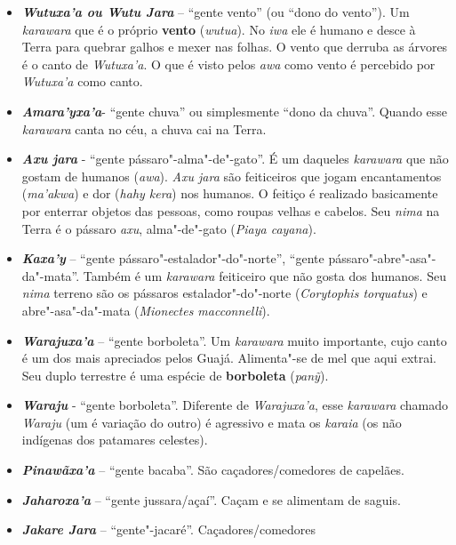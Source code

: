 \begin{itemize}
  \emph{\textbf{Itaxa'a}} -- ``gente pedra'' (também pode ser chamado de
  ``dono da pedra''). Caçadores de anta. Não à toa, a primeira anta,
  criada por \emph{Maira}, foi feita a partir de uma pedra.
\item
  \emph{\textbf{Wutuxa'a ou Wutu Jara}} -- ``gente vento'' (ou ``dono do
  vento''). Um \emph{karawara} que é o próprio \textbf{vento}
  (\emph{wutua}). No \emph{iwa} ele é humano e desce à Terra para
  quebrar galhos e mexer nas folhas. O vento que derruba as árvores é o
  canto de \emph{Wutuxa'a}. O que é visto pelos \emph{awa} como vento é
  percebido por \emph{Wutuxa'a} como canto.
\item
  \emph{\textbf{Amara'yxa'a}}- ``gente chuva'' ou simplesmente ``dono da
  chuva''. Quando esse \emph{karawara} canta no céu, a chuva cai na
  Terra.
\item
  \emph{\textbf{Axu jara}} - ``gente pássaro"-alma"-de"-gato''. É um
  daqueles \emph{karawara} que não gostam de humanos (\emph{awa}).
  \emph{Axu jara} são feiticeiros que jogam encantamentos
  (\emph{ma'akwa}) e dor (\emph{hahy kera}) nos humanos. O feitiço é
  realizado basicamente por enterrar objetos das pessoas, como roupas
  velhas e cabelos. Seu \emph{nima} na Terra é o pássaro \emph{axu},
  alma"-de"-gato (\emph{Piaya cayana}).
\item
  \emph{\textbf{Kaxa'y}} -- ``gente pássaro"-estalador"-do"-norte'',
  ``gente pássaro"-abre"-asa"-da"-mata''. Também é um \emph{karawara}
  feiticeiro que não gosta dos humanos. Seu \emph{nima} terreno são os
  pássaros estalador"-do"-norte (\emph{Corytophis torquatus}) e
  abre"-asa"-da"-mata (\emph{Mionectes macconnelli}).
\item
  \emph{\textbf{Warajuxa'a}} -- ``gente borboleta''. Um \emph{karawara}
  muito importante, cujo canto é um dos mais apreciados pelos Guajá.
  Alimenta"-se de mel que aqui extrai. Seu duplo terrestre é uma espécie
  de \textbf{borboleta} (\emph{panỹ}).
\item
  \emph{\textbf{Waraju}} - ``gente borboleta''. Diferente de
  \emph{Warajuxa'a}, esse \emph{karawara} chamado \emph{Waraju} (um é
  variação do outro) é agressivo e mata os \emph{karaia} (os não
  indígenas dos patamares celestes).
\item
  \emph{\textbf{Pinawãxa'a}} -- ``gente bacaba''. São
  caçadores/comedores de capelães.
\item
  \emph{\textbf{Jaharoxa'a}} -- ``gente jussara/açaí''. Caçam e se
  alimentam de saguis.
\item
  \emph{\textbf{Jakare Jara}} -- ``gente"-jacaré''. Caçadores/comedores

\end{itemize}
